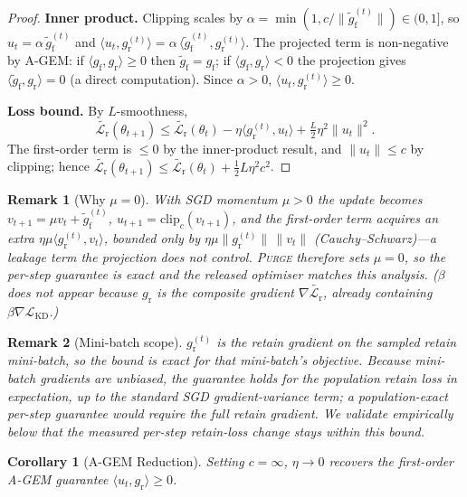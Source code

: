 \documentclass[letterpaper]{article}
\newcommand{\ours}{\textsc{Purge}}
\newcommand{\gf}{g_{\mathrm{f}}}
\newcommand{\gr}{g_{\mathrm{r}}}
\newcommand{\gproj}{\tilde{g}_{\mathrm{f}}}
\newcommand{\lossr}{\mathcal{L}_{\mathrm{r}}}
\newcommand{\losskd}{\mathcal{L}_{\mathrm{KD}}}
\newtheorem{corollary}[theorem]{Corollary}
\newtheorem{remark}{Remark}
\begin{document}
\begin{proof}
\textbf{Inner product.} Clipping scales by $\alpha = \min(1, c/\|\gproj^{(t)}\|)\in(0,1]$, so $u_t = \alpha\,\gproj^{(t)}$ and $\langle u_t, \gr^{(t)}\rangle = \alpha\,\langle \gproj^{(t)}, \gr^{(t)}\rangle$. The projected term is non-negative by A-GEM: if $\langle \gf, \gr\rangle\ge 0$ then $\gproj=\gf$; if $\langle\gf,\gr\rangle<0$ the projection gives $\langle \gproj,\gr\rangle = 0$ (a direct computation). Since $\alpha>0$, $\langle u_t,\gr^{(t)}\rangle\ge0$.

\textbf{Loss bound.} By $L$-smoothness,
\[
\widetilde{\lossr}(\theta_{t+1}) \le \widetilde{\lossr}(\theta_t) - \eta\langle \gr^{(t)}, u_t\rangle + \tfrac{L}{2}\eta^2\|u_t\|^2.
\]
The first-order term is $\le 0$ by the inner-product result, and $\|u_t\|\le c$ by clipping; hence $\widetilde{\lossr}(\theta_{t+1}) \le \widetilde{\lossr}(\theta_t) + \tfrac{1}{2}L\eta^2 c^2$.
\end{proof}

\begin{remark}[Why $\mu=0$]
With SGD momentum $\mu>0$ the update becomes $v_{t+1}=\mu v_t + \gproj^{(t)}$, $u_{t+1}=\mathrm{clip}_c(v_{t+1})$, and the first-order term acquires an extra $\eta\mu\langle\gr^{(t)},v_t\rangle$, bounded only by $\eta\mu\|\gr^{(t)}\|\,\|v_t\|$ (Cauchy--Schwarz)---a leakage term the projection does \emph{not} control. \ours{} therefore sets $\mu=0$, so the per-step guarantee is exact and the released optimiser matches this analysis. ($\beta$ does not appear because $\gr$ is the composite gradient $\nabla\widetilde{\lossr}$, already containing $\beta\nabla\losskd$.)
\end{remark}

\begin{remark}[Mini-batch scope]
$\gr^{(t)}$ is the retain gradient on the \emph{sampled} retain mini-batch, so the bound is exact for that mini-batch's objective. Because mini-batch gradients are unbiased, the guarantee holds for the population retain loss in expectation, up to the standard SGD gradient-variance term; a population-exact per-step guarantee would require the full retain gradient. We validate empirically below that the measured per-step retain-loss change stays within this bound.
\end{remark}

\begin{corollary}[A-GEM Reduction]
Setting $c = \infty$, $\eta\to0$ recovers the first-order A-GEM guarantee $\langle u_t, \gr\rangle \ge 0$.
\end{corollary}
\end{document}
